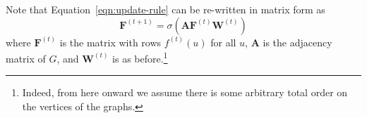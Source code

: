 Note that Equation~\eqref{eqn:update-rule} can be re-written in matrix
form as
\begin{equation}\label{eqn:update-rule-matrix}
    \mathbf{F}^{(t+1)} = \sigma\left(\mathbf{AF}^{(t)}\mathbf{W}^{(t)}\right)
\end{equation}
where $\mathbf{F}^{(t)}$ is the matrix with rows $f^{(t)}(u)$ for all $u$,
$\mathbf{A}$ is the adjacency matrix of $G$, and $\mathbf{W}^{(t)}$ is as
before.\footnote{Indeed, from here onward we assume
there is some
arbitrary total order on the vertices of the graphs.}





